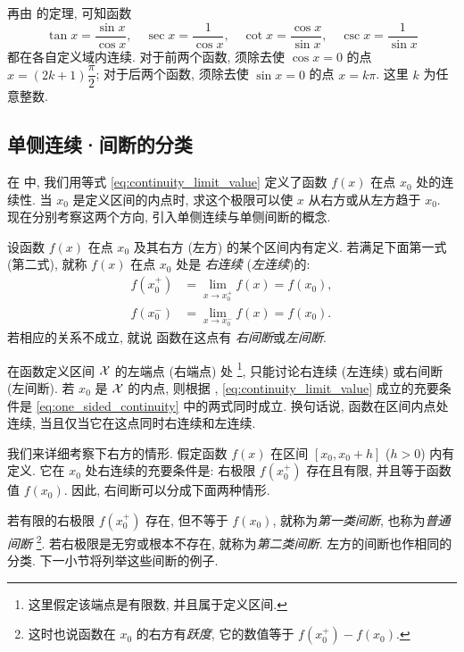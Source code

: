 再由  的定理, 可知函数
$$
\tan x=\frac{\sin x}{\cos x},\quad \sec x=\frac1{\cos x},\quad
\cot x=\frac{\cos x}{\sin x},\quad \csc x=\frac1{\sin x}
$$
都在各自定义域内连续.
对于前两个函数, 须除去使 $\cos x=0$ 的点
$x=(2k+1)\dfrac\pi2$;
对于后两个函数, 须除去使 $\sin x=0$ 的点 $x=k\pi$.
这里 $k$ 为任意整数.

\subsection{单侧连续·间断的分类}\label{subsec:69}
在  中, 我们用等式 \eqref{eq:continuity_limit_value}
定义了函数 $f(x)$ 在点 $x_0$ 处的连续性.
当 $x_0$ 是定义区间的内点时, 求这个极限可以使 $x$ 从右方或从左方趋于 $x_0$.
现在分别考察这两个方向, 引入单侧连续与单侧间断的概念.

{\kaishu 
设函数 $f(x)$ 在点 $x_0$ 及其右方 (左方) 的某个区间内有定义.
若满足下面第一式 (第二式), 就称 $f(x)$ 在点 $x_0$ 处是
\emph{右连续}
(\emph{左连续})的:
\begin{equation}\label{eq:one_sided_continuity}
\begin{aligned}
f(x_0^+)&=\lim_{x\to x_0^+}f(x)=f(x_0),\\
f(x_0^-)&=\lim_{x\to x_0^-}f(x)=f(x_0).
\end{aligned}
\end{equation}
}
若相应的关系不成立, 就说
{\kaishu 
函数在这点有
\emph{右间断}或\emph{左间断}.
}

在函数定义区间 $\mathcal{X}$ 的左端点 (右端点) 处
\footnote{这里假定该端点是有限数, 并且属于定义区间.},
只能讨论右连续 (左连续) 或右间断 (左间断).
若 $x_0$ 是 $\mathcal{X}$ 的内点, 则根据 ,
\eqref{eq:continuity_limit_value} 成立的充要条件是
\eqref{eq:one_sided_continuity} 中的两式同时成立.
换句话说, {\kaishu 函数在区间内点处连续, 当且仅当它在这点同时右连续和左连续.}

我们来详细考察下右方的情形. 
假定函数 $f(x)$ 在区间 $[x_0,x_0+h]$ ($h>0$) 内有定义.
它在 $x_0$ 处右连续的充要条件是: 右极限 $f(x_0^+)$ 存在且有限,
并且等于函数值 $f(x_0)$.
因此, 右间断可以分成下面两种情形.

若有限的右极限 $f(x_0^+)$ 存在, 但不等于 $f(x_0)$,
就称为\emph{第一类间断}, 也称为\emph{普通间断}
\footnote{这时也说函数在 $x_0$ 的右方有\emph{跃度},
它的数值等于 $f(x_0^+)-f(x_0)$.}.
若右极限是无穷或根本不存在, 就称为\emph{第二类间断}.
左方的间断也作相同的分类. 下一小节将列举这些间断的例子.


